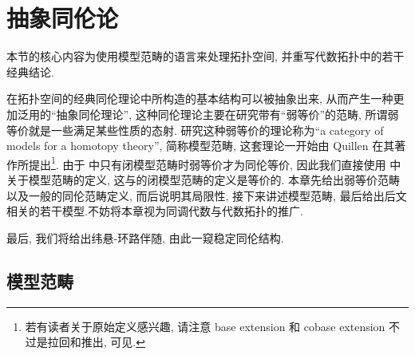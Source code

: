 \chapter{抽象同伦论}\label{抽象同伦论}
\begin{introduction}
    \item 本节的核心内容为使用模型范畴的语言来处理拓扑空间, 并重写代数拓扑中的若干经典结论.
    \item 在拓扑空间的经典同伦理论中所构造的基本结构可以被抽象出来, 从而产生一种更加泛用的``抽象同伦理论'', 这种同伦理论主要在研究带有``弱等价''的范畴, 所谓弱等价就是一些满足某些性质的态射. 研究这种弱等价的理论称为``a category of models for a homotopy theory'', 简称模型范畴, 这套理论一开始由 Quillen 在其著作\parencite[Chapter 1.]{quillen2006homotopical}所提出\footnote{若有读者关于原始定义感兴趣, 请注意 base extension 和 cobase extension 不过是拉回和推出, 可见\parencite[\href{https://ncatlab.org/nlab/show/cobase+change}{cobase change}]{nlab:homepage}.}. 由于\cite{quillen2006homotopical} 中只有闭模型范畴时弱等价才为同伦等价, 因此我们直接使用 \cite{dwyer2004homotopy} 中关于模型范畴的定义, 这与\parencite[Definition 1.5.1.]{quillen2006homotopical}的闭模型范畴的定义是等价的. 本章先给出弱等价范畴以及一般的同伦范畴定义, 而后说明其局限性, 接下来讲述模型范畴, 最后给出后文相关的若干模型.不妨将本章视为同调代数与代数拓扑的推广.
    \item 最后, 我们将给出纬悬-环路伴随, 由此一窥稳定同伦结构.
\end{introduction}
\section{模型范畴}

